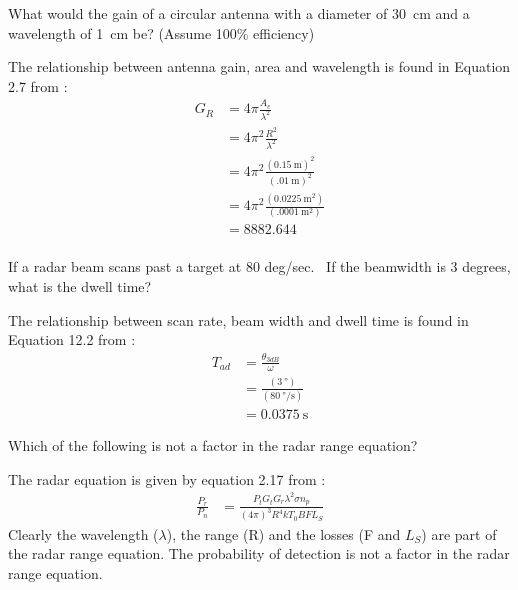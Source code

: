 \documentclass[12pt]{article}
\newenvironment{exercise}[2][Exercise]{\begin{trivlist}
    \item[\hskip \labelsep {\bfseries #1}\hskip \labelsep {\bfseries #2.}]}{\end{trivlist}}
\begin{document}
      \begin{exercise}{2}
      What would the gain of a circular antenna with a diameter of \SI{30}{\cm} and a wavelength of \SI{1}{\cm} be? (Assume 100\% efficiency)
      
      The relationship between antenna gain, area and wavelength is found in Equation 2.7 from \cite[p.~63]{POMR}:
      \begin{align*}
      G_{R} & = 4 \pi \frac{ A_{e} }{\lambda^{2}} \\
      & = 4 \pi^{2} \frac{ R^{2}}{\lambda^{2}}\\
      & = 4 \pi^{2} \frac{ (\SI{0.15}{\meter})^{2}}{(\SI{.01}{\meter})^{2}}\\
      & = 4 \pi^{2} \frac{ (\SI{0.0225}{\meter\squared}) }{ (\SI{.0001}{\meter\squared}) }\\
      & = \SI{8882.644}{}\\
      \end{align*}      
      \end{exercise}
      
      \begin{exercise}{3}
      If a radar beam scans past a target at 80 deg/sec.  If the beamwidth is 3 degrees, what is the dwell time?

      The relationship between scan rate, beam width and dwell time is found in Equation 12.2 from \cite[p.~88]{POMR}:
      \begin{align*}
      T_{ad} & = \frac{\theta_{3 dB}}{\omega}\\
      & = \frac{ (\SI{3}{\degree}) }{ (\SI{80}{\degree\per\second}) }\\
      & = \SI{0.0375}{\second}
      \end{align*}      
      \end{exercise}

      \begin{exercise}{4}
      Which of the following is not a factor in the radar range equation?

      The radar equation is given by equation 2.17 from \cite[p.~68]{POMR}:
      \begin{align*}
      \frac{P_{r}}{P_{n}} & = \frac{ P_{t} G_{t} G_{r} \lambda^{2} \sigma n_{p} }{ (4\pi)^{3} R^{4} k T_{0} B F L_{S} }
      \end{align*}
      Clearly the wavelength ($\lambda$), the range (R) and the losses (F and $L_{S}$) are part of the radar range equation. The probability  of detection is not a factor in the radar range equation.
      \end{exercise}
\end{document}
